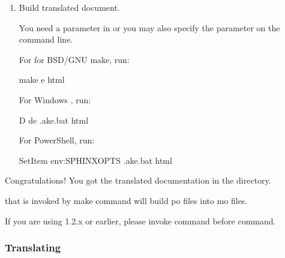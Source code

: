 \documentclass[letterpaper,10pt,english]{sphinxmanual}
\begin{document}
\begin{enumerate}
Please be careful not to break reST notation.  Most po\sphinxhyphen{}editors will help you
with that.

\item {} 
Build translated document.

You need a  parameter in  or you may also
specify the parameter on the command line.

For for BSD/GNU make, run:

\begin{sphinxVerbatim}[commandchars=\\\{\}]
 make \PYGZhy{}e  html
\end{sphinxVerbatim}

For Windows , run:

\begin{sphinxVerbatim}[commandchars=\\\{\}]
  \PYGZhy{}D de
 .ake.bat html
\end{sphinxVerbatim}

For PowerShell, run:

\begin{sphinxVerbatim}[commandchars=\\\{\}]
 Set\PYGZhy{}Item env:SPHINXOPTS 
 .ake.bat html
\end{sphinxVerbatim}

\end{enumerate}

Congratulations! You got the translated documentation in the 
directory.

 that is invoked by make command will build po files
into mo files.

If you are using 1.2.x or earlier, please invoke 
command before  command.


\subsubsection{Translating}
\label{\detokenize{usage/advanced/intl:translating}}
\end{document}
